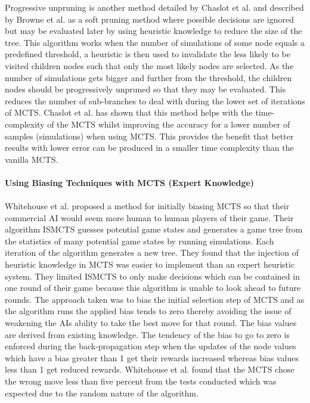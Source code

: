 \documentclass[journal]{IEEEtran}
\begin{document}
  Progressive unpruning is another method detailed by Chaslot et al. \cite{progressive} and described by Browne et al. \cite{survey} as a soft pruning method where possible decisions are ignored but may be evaluated later by using heuristic knowledge to reduce the size of the tree. This algorithm works when the number of simulations of some node equals a predefined threshold, a heuristic is then used to invalidate the less likely to be visited children nodes such that only the most likely nodes are selected. As the number of simulations gets bigger and further from the threshold, the children nodes should be progressively unpruned so that they may be evaluated. This reduces the number of sub-branches to deal with during the lower set of iterations of MCTS. Chaslot et al. \cite{progressive} has shown that this method helps with the time-complexity of the MCTS whilst improving the accuracy for a lower number of samples (simulations) when using MCTS. This provides the benefit that better results with lower error can be produced in a smaller time complexity than the vanilla MCTS.\\\\
  
  \textbf{Using Biasing Techniques with MCTS (Expert Knowledge)}\\\\
  Whitehouse et al. \cite{knowledge} proposed a method for initially biasing MCTS so that their commercial AI would seem more human to human players of their game. Their algorithm ISMCTS guesses potential game states and generates a game tree from the statistics of many potential game states by running simulations. Each iteration of the algorithm generates a new tree. They found that the injection of heuristic knowledge in MCTS was easier to implement than an expert heuristic system. They limited ISMCTS to only make decisions which can be contained in one round of their game because this algorithm is unable to look ahead to future rounds. The approach taken was to bias the initial selection step of MCTS and as the algorithm runs the applied bias tends to zero thereby avoiding the issue of weakening the AIs ability to take the best move for that round. The bias values are derived from existing knowledge. The tendency of the bias to go to zero is enforced during the back-propagation step when the updates of the node values which have a bias greater than 1 get their rewards increased whereas bias values less than 1 get reduced rewards. Whitehouse et al. \cite{knowledge} found that the MCTS chose the wrong move less than five percent from the tests conducted which was expected due to the random nature of the algorithm.\\
  
\end{document}
